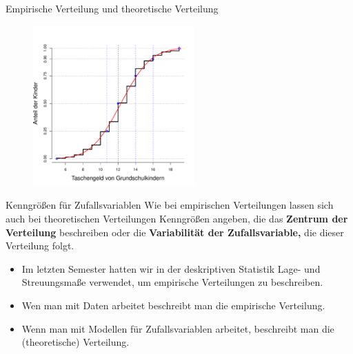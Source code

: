\documentclass[usenames,dvipsnames,handout]{beamer}
\begin{document}
\begin{frame}{Empirische Verteilung und theoretische Verteilung}
       
       \begin{figure}[ht]
 	\centering
 	      \includegraphics[width=0.55\textwidth]{taschengeld_theo.pdf}
 	\end{figure}
\end{frame}



\begin{frame}{Kenngrößen für Zufallsvariablen}%
Wie bei empirischen Verteilungen lassen sich auch bei theoretischen Verteilungen Kenngrößen angeben, die das \textbf{Zentrum der Verteilung}
beschreiben oder die \textbf{Variabilität der Zufallsvariable,} die dieser Verteilung folgt.
\begin{itemize}
\item{Im letzten Semester hatten wir in der deskriptiven Statistik Lage- und Streuungsmaße verwendet, um empirische Verteilungen zu beschreiben. }
\item{Wen man mit Daten arbeitet beschreibt man die empirische Verteilung.}
\item{Wenn man mit Modellen für Zufallsvariablen arbeitet, beschreibt man die (theoretische) Verteilung.}
\end{itemize}
\end{frame}
\end{document}
